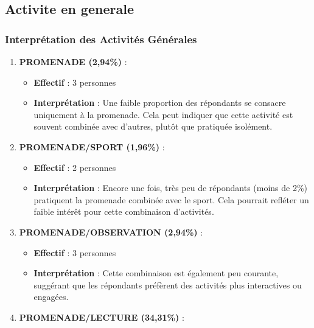 \documentclass[
]{article}
\providecommand{\tightlist}{%
  \setlength{\itemsep}{0pt}\setlength{\parskip}{0pt}}
\begin{document}
\renewcommand*{\arraystretch}{1}

\subsection{Activite en generale}\label{activite-en-generale}

\subsubsection{Interprétation des Activités
Générales}\label{interpruxe9tation-des-activituxe9s-guxe9nuxe9rales}

\begin{enumerate}
\def\labelenumi{\arabic{enumi}.}
\tightlist
\item
  \textbf{PROMENADE (2,94\%)} :

  \begin{itemize}
  \tightlist
  \item
    \textbf{Effectif} : 3 personnes
  \item
    \textbf{Interprétation} : Une faible proportion des répondants se
    consacre uniquement à la promenade. Cela peut indiquer que cette
    activité est souvent combinée avec d'autres, plutôt que pratiquée
    isolément.
  \end{itemize}
\item
  \textbf{PROMENADE/SPORT (1,96\%)} :

  \begin{itemize}
  \tightlist
  \item
    \textbf{Effectif} : 2 personnes
  \item
    \textbf{Interprétation} : Encore une fois, très peu de répondants
    (moins de 2\%) pratiquent la promenade combinée avec le sport. Cela
    pourrait refléter un faible intérêt pour cette combinaison
    d'activités.
  \end{itemize}
\item
  \textbf{PROMENADE/OBSERVATION (2,94\%)} :

  \begin{itemize}
  \tightlist
  \item
    \textbf{Effectif} : 3 personnes
  \item
    \textbf{Interprétation} : Cette combinaison est également peu
    courante, suggérant que les répondants préfèrent des activités plus
    interactives ou engagées.
  \end{itemize}
\item
  \textbf{PROMENADE/LECTURE (34,31\%)} :


\end{enumerate}
\end{document}
